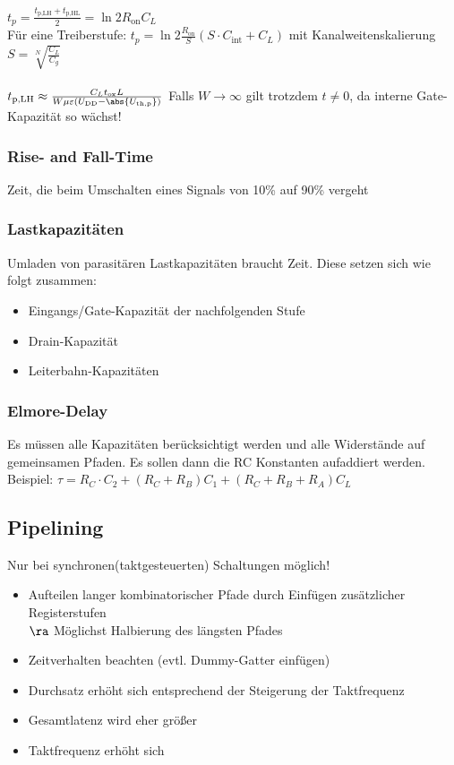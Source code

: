 \documentclass[english]{latex4ei/latex4ei_sheet}
\begin{document}
$t_p = \frac{t_{\text{p,LH}} + t_{\text{p,HL}}}{2} = \ln{2}R_{\text{on}}C_L$\\
Für eine Treiberstufe: $t_p = \ln{2}\frac{R_{\text{on}}}{S}(S\cdot C_{\text{int}} + C_L)$ mit Kanalweitenskalierung $S=\sqrt[N]{\frac{C_L}{C_g}}$\\ \\

$t_{\text{p,LH}} \approx \frac{C_L t_{\text{ox}}L}{W\mu\varepsilon(U_{\text{DD}}-\abs{U_{\text{th,p}}})}$
Falls $W\rightarrow\infty$ gilt trotzdem $t\neq 0$, da interne Gate-Kapazität so wächst!

\subsubsection{Rise- and Fall-Time}
Zeit, die beim Umschalten eines Signals von 10\% auf 90\% vergeht

\subsubsection{Lastkapazitäten}
Umladen von parasitären Lastkapazitäten braucht Zeit.
Diese setzen sich wie folgt zusammen:
\begin{itemize}
    \item Eingangs/Gate-Kapazität der nachfolgenden Stufe
    \item Drain-Kapazität
    \item Leiterbahn-Kapazitäten
\end{itemize}

\subsubsection{Elmore-Delay}
Es müssen alle Kapazitäten berücksichtigt werden und alle Widerstände auf gemeinsamen Pfaden. Es sollen dann die RC Konstanten aufaddiert werden.\\
Beispiel: $\tau = R_C\cdot C_2 + (R_C+R_B)C_1+(R_C+R_B+R_A)C_L$

\subsection{Pipelining} %
Nur bei synchronen(taktgesteuerten) Schaltungen möglich!
\begin{itemize} \itemsep0pt
    \item Aufteilen langer kombinatorischer Pfade durch Einfügen zusätzlicher Registerstufen\\
          $\ra$ Möglichst Halbierung des längsten Pfades
    \item Zeitverhalten beachten (evtl. Dummy-Gatter einfügen)
    \item Durchsatz erhöht sich entsprechend der Steigerung der Taktfrequenz
    \item Gesamtlatenz wird eher größer
    \item Taktfrequenz erhöht sich
\end{itemize}
\end{document}
